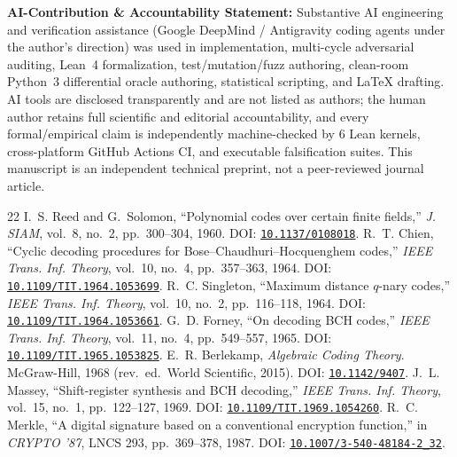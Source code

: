 \documentclass[11pt,letterpaper]{article}
\theoremstyle{remark}
\begin{document}
\smallskip\noindent\textbf{AI-Contribution \& Accountability Statement:} Substantive AI engineering and verification assistance (Google DeepMind / Antigravity coding agents under the author's direction) was used in implementation, multi-cycle adversarial auditing, Lean~4 formalization, test/mutation/fuzz authoring, clean-room Python~3 differential oracle authoring, statistical scripting, and LaTeX drafting. AI tools are disclosed transparently and are not listed as authors; the human author retains full scientific and editorial accountability, and every formal/empirical claim is independently machine-checked by 6 Lean kernels, cross-platform GitHub Actions CI, and executable falsification suites. This manuscript is an independent technical preprint, not a peer-reviewed journal article.

{\sloppy
\begin{thebibliography}{22}
\footnotesize
\setlength{\itemsep}{0pt}
\setlength{\parskip}{0pt}
 I.~S. Reed and G.~Solomon, ``Polynomial codes over certain finite fields,'' \emph{J. SIAM}, vol.~8, no.~2, pp.~300--304, 1960. DOI: \href{https://doi.org/10.1137/0108018}{\nolinkurl{10.1137/0108018}}.
 R.~T. Chien, ``Cyclic decoding procedures for Bose--Chaudhuri--Hocquenghem codes,'' \emph{IEEE Trans. Inf. Theory}, vol.~10, no.~4, pp.~357--363, 1964. DOI: \href{https://doi.org/10.1109/TIT.1964.1053699}{\nolinkurl{10.1109/TIT.1964.1053699}}.
 R.~C. Singleton, ``Maximum distance $q$-nary codes,'' \emph{IEEE Trans. Inf. Theory}, vol.~10, no.~2, pp.~116--118, 1964. DOI: \href{https://doi.org/10.1109/TIT.1964.1053661}{\nolinkurl{10.1109/TIT.1964.1053661}}.
 G.~D. Forney, ``On decoding BCH codes,'' \emph{IEEE Trans. Inf. Theory}, vol.~11, no.~4, pp.~549--557, 1965. DOI: \href{https://doi.org/10.1109/TIT.1965.1053825}{\nolinkurl{10.1109/TIT.1965.1053825}}.
 E.~R. Berlekamp, \emph{Algebraic Coding Theory}. McGraw-Hill, 1968 (rev.\ ed.\ World Scientific, 2015). DOI: \href{https://doi.org/10.1142/9407}{\nolinkurl{10.1142/9407}}.
 J.~L. Massey, ``Shift-register synthesis and BCH decoding,'' \emph{IEEE Trans. Inf. Theory}, vol.~15, no.~1, pp.~122--127, 1969. DOI: \href{https://doi.org/10.1109/TIT.1969.1054260}{\nolinkurl{10.1109/TIT.1969.1054260}}.
 R.~C. Merkle, ``A digital signature based on a conventional encryption function,'' in \emph{CRYPTO '87}, LNCS 293, pp.~369--378, 1987. DOI: \href{https://doi.org/10.1007/3-540-48184-2_32}{\nolinkurl{10.1007/3-540-48184-2_32}}.

\end{thebibliography}}
\end{document}
